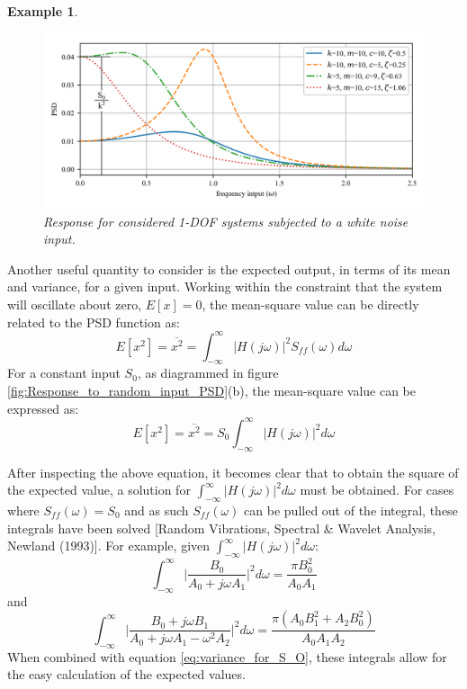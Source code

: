 \documentclass[12pt,letter]{article}
\newtheorem{ex}{Example}
\numberwithin{ex}{section} %
\newenvironment{example}{\begin{mdframed}[middlelinewidth=0.5mm]\begin{ex}\normalfont}{\end{ex}\end{mdframed}}
\numberwithin{re}{section} %
\begin{document}
\begin{example}
\begin{figure}[H]
		\centering
		\includegraphics[width=1\textwidth]{../Figures/response_to_white_noise_with_annotation.png}
		\caption{Response for considered 1-DOF systems subjected to a white noise input.}
	\end{figure}
\end{example}  

Another useful quantity to consider is the expected output, in terms of its mean and variance, for a given input. Working within the constraint that the system will oscillate about zero, $E[x]=0$, the mean-square value can be directly related to the PSD function as:
\begin{equation}
E[x^2] = \overline{x^2} =   \int_{-\infty}^{\infty} |H(j\omega)|^2 S_{ff}(\omega) d\omega
\end{equation}
For a constant input $S_0$, as diagrammed in figure \ref{fig:Response_to_random_input_PSD}(b), the mean-square value can be expressed as:
\begin{equation}
E[x^2] = \overline{x^2} =   S_{0} \int_{-\infty}^{\infty} |H(j\omega)|^2 d\omega
\label{eq:variance_for_S_O}
\end{equation}

After inspecting the above equation, it becomes clear that to obtain the square of the expected value, a solution for  $\int_{-\infty}^{\infty} |H(j\omega)|^2 d\omega$ must be obtained. For cases where $S_{ff}(\omega) = S_0$ and as such $S_{ff}(\omega)$ can be pulled out of the integral, these integrals have been solved [Random Vibrations, Spectral \& Wavelet Analysis, Newland (1993)]. For example, given $\int_{-\infty}^{\infty} |H(j\omega)|^2 d\omega$:
\begin{equation}
\int_{-\infty}^{\infty} \bigg|\frac{B_0}{A_0+j \omega A_1} \bigg|^2 d\omega = \frac{\pi B_0^2}{A_0 A_1}
\end{equation} 
and
\begin{equation}
\int_{-\infty}^{\infty} \bigg|\frac{B_0 + j \omega B_1}{A_0+j \omega A_1 - \omega^2 A_2} \bigg|^2 d\omega = \frac{\pi (A_0 B_1^2 + A_2 B_0^2)}{A_0 A_1 A_2}
\end{equation} 
When combined with equation \ref{eq:variance_for_S_O}, these integrals allow for the easy calculation of the expected values. 
\end{document}
